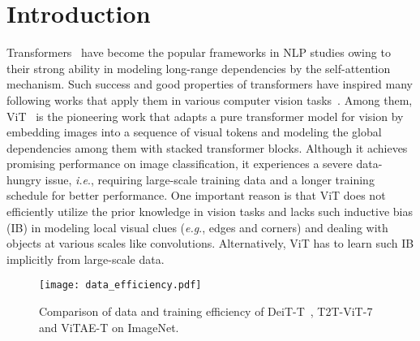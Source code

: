 \documentclass[twocolumn]{svjour3}          \smartqed  \usepackage{natbib}
\newcommand{\ie}{i.e}
\newcommand{\eg}{e.g}
\def\onedot{.\xspace}
\def\eg{\emph{e.g}\onedot}
\def\ie{\emph{i.e}\onedot}
\begin{document}
\section{Introduction}
\label{intro}

Transformers~\citep{vaswani2017attention,devlin2018bert} have become the popular frameworks in NLP studies owing to their strong ability in modeling long-range dependencies by the self-attention mechanism. Such success and good properties of transformers have inspired many following works that apply them in various computer vision tasks~\citep{dosovitskiy2020image,zheng2020rethinking,wang2021pyramid}. Among them, ViT~\citep{dosovitskiy2020image} is the pioneering work that adapts a pure transformer model for vision by embedding images into a sequence of visual tokens and modeling the global dependencies among them with stacked transformer blocks. Although it achieves promising performance on image classification, it experiences a severe data-hungry issue, \ie, requiring large-scale training data and a longer training schedule for better performance. One important reason is that ViT does not efficiently utilize the prior knowledge in vision tasks and lacks such inductive bias (IB) in modeling local visual clues (\eg, edges and corners) and dealing with objects at various scales like convolutions. Alternatively, ViT has to learn such IB implicitly from large-scale data.


\begin{figure}
    \texttt{[image: data\_efficiency.pdf]}
    \caption{Comparison of data and training efficiency of DeiT-T~\citep{touvron2020training}, T2T-ViT-7~\citep{yuan2021tokens} and ViTAE-T on ImageNet.}
    \label{fig:efficiency}
\end{figure}
\end{document}
